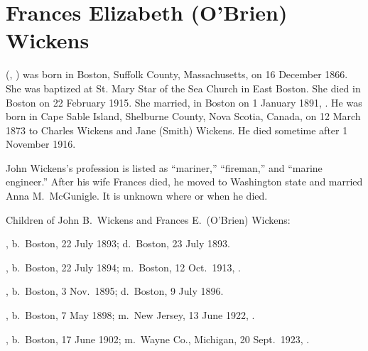 \section{Frances Elizabeth (O'Brien) Wickens}

 (, ) was born in Boston, Suffolk County, Massachusetts, on 16 December 1866.\cite{Frances3OBrienBirth} She was baptized at St. Mary Star of the Sea Church in East Boston.\cite{Frances3OBrienBaptism} She died in Boston on 22 February 1915.\cite{Frances3OBrienDeath} She married, in Boston on 1 January 1891, .\cite{JohnWickensMarriage} He was born in Cape Sable Island, Shelburne County, Nova Scotia, Canada, on 12 March 1873\cite{JohnWickensNaturalization} to Charles Wickens and Jane (Smith) Wickens.\cite{JohnWickensMarriage,JohnWickensMarriage2} He died sometime after 1 November 1916.\cite{JohnWickensMarriage2}

John Wickens's profession is listed as ``mariner,''\cite{JohnWickensMarriage} ``fireman,''\cite{JohnWickensNaturalization} and ``marine engineer.''\cite{Census1900JohnWickens} After his wife Frances died, he moved to Washington state and married Anna M.\ McGunigle.\cite{JohnWickensMarriage2} It is unknown where or when he died.

\begin{KidsIntro}
	Children of John B.\ Wickens and Frances E.\ (O'Brien) Wickens:
\end{KidsIntro}

\begin{Kids}
	, b.\ Boston, 22 July 1893;\cite{Nellie4WickensDeath} d.\ Boston, 23 July 1893.\cite{Nellie4WickensDeath}
	
	, b.\ Boston, 22 July 1894; m.\ Boston, 12 Oct.\ 1913, .
	
	, b.\ Boston, 3 Nov.\ 1895;\cite{Frederick4WickensBirth} d.\ Boston, 9 July 1896.\cite{Frederick4WickensDeath}
	
	, b.\ Boston, 7 May 1898; m.\ New Jersey, 13 June 1922, .
	
	, b.\ Boston, 17 June 1902; m.\ Wayne Co., Michigan, 20 Sept.\ 1923, .
	
\end{Kids}